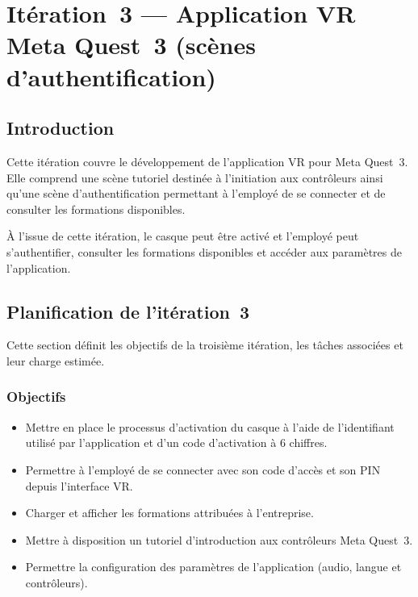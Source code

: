 
\chapter{Itération~3 --- Application VR Meta Quest~3 (scènes d'authentification)}

\section{Introduction}

 Cette itération couvre le développement de l'application VR pour Meta Quest~3.
Elle comprend une scène tutoriel destinée à l'initiation aux contrôleurs ainsi
qu'une scène d'authentification permettant à l'employé de se connecter et de
consulter les formations disponibles.

À l'issue de cette itération, le casque peut être activé et l'employé peut
s'authentifier, consulter les formations disponibles et accéder aux paramètres
de l'application.

\section{Planification de l'itération~3}

Cette section définit les objectifs de la troisième itération, les tâches associées et
leur charge estimée.

\subsection{Objectifs}

\begin{itemize}

  \item Mettre en place le processus d'activation du casque à l'aide de
    l'identifiant utilisé par l'application et d'un code d'activation à 6 chiffres.

  \item Permettre à l'employé de se connecter avec son code d'accès et son PIN
    depuis l'interface VR.

  \item Charger et afficher les formations attribuées à l'entreprise.

  \item Mettre à disposition un tutoriel d'introduction aux contrôleurs
    Meta Quest~3.

  \item Permettre la configuration des paramètres de l'application
    (audio, langue et contrôleurs).

\end{itemize}
